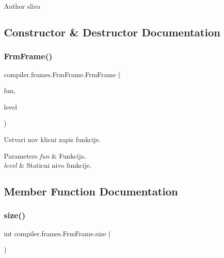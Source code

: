 \begin{DoxyAuthor}{Author}
sliva 
\end{DoxyAuthor}


\subsection{Constructor \& Destructor Documentation}
\mbox{\label{classcompiler_1_1frames_1_1_frm_frame_acf9124e5c5408bc0f4a80bc61e492273}} 
\subsubsection{\texorpdfstring{Frm\+Frame()}{FrmFrame()}}
{\footnotesize\ttfamily compiler.\+frames.\+Frm\+Frame.\+Frm\+Frame (\begin{DoxyParamCaption}\item[{\hyperlink{classcompiler_1_1abstr_1_1tree_1_1def_1_1_abs_fun_def}{Abs\+Fun\+Def}}]{fun,  }\item[{int}]{level }\end{DoxyParamCaption})}

Ustvari nov klicni zapis funkcije.


\begin{DoxyParams}{Parameters}
{\em fun} & Funkcija. \\
\hline
{\em level} & Staticni nivo funkcije. \\
\hline
\end{DoxyParams}


\subsection{Member Function Documentation}
\mbox{\label{classcompiler_1_1frames_1_1_frm_frame_adefc5d8bee9e566c0a632fc3adbf860a}} 
\subsubsection{\texorpdfstring{size()}{size()}}
{\footnotesize\ttfamily int compiler.\+frames.\+Frm\+Frame.\+size (\begin{DoxyParamCaption}{ }\end{DoxyParamCaption})}

